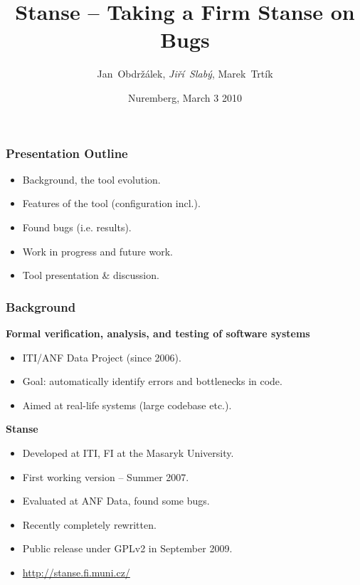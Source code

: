 \documentclass[handout,xcolor=dvipsnames]{beamer}
\title[Stanse] %
{Stanse -- Taking a Firm Stanse on Bugs}
\author[J. Obdržálek, J. Slabý, M. Trtík]{Jan~Obdržálek, \emph{Jiří~Slabý}, Marek~Trtík}
\institute[ITI] %
{ITI, Faculty of Informatics, Masaryk University, Brno}
\date[03.03. 2010, Nuremberg]{Nuremberg, March 3 2010}
\newcommand{\heading}[1]{\textbf{\textcolor{BurntOrange}{#1}}}
\begin{document}
\begin{frame}
  \titlepage
\end{frame}


\begin{frame}
  \frametitle{Presentation Outline}
  \begin{itemize}
  \item Background, the tool evolution.
  \item Features of the tool (configuration incl.).
  \item Found bugs (i.e. results).
  \item Work in progress and future work.
  \item Tool presentation \& discussion.
  \end{itemize}
\end{frame}

\begin{frame}
  \frametitle{Background}
  \heading{Formal verification, analysis, and testing of software
      systems}
  \begin{itemize}
  \item ITI/ANF Data Project (since 2006).
  \item Goal: automatically identify errors and bottlenecks in code.
  \item Aimed at real-life systems (large codebase etc.).
  \end{itemize}

  \pause
  \medskip
  \heading{Stanse}
  \begin{itemize}
  \item Developed at ITI, FI at the Masaryk University.
  \item First working version -- Summer 2007.
  \item Evaluated at ANF Data, found some bugs.
  \item Recently completely rewritten.
  \item Public release under GPLv2 in September 2009.
  \item \url{http://stanse.fi.muni.cz/}
  \end{itemize}

\end{frame}
\end{document}
